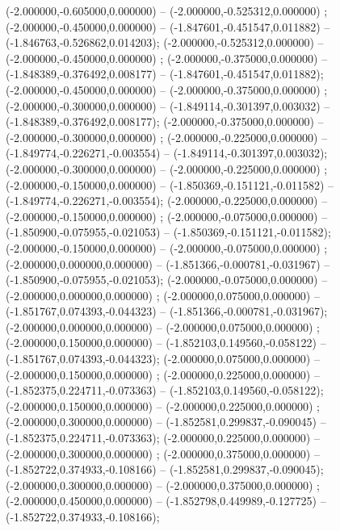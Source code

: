  (-2.000000,-0.605000,0.000000) -- (-2.000000,-0.525312,0.000000) ;
 (-2.000000,-0.450000,0.000000) -- (-1.847601,-0.451547,0.011882) -- (-1.846763,-0.526862,0.014203);
 (-2.000000,-0.525312,0.000000) -- (-2.000000,-0.450000,0.000000) ;
 (-2.000000,-0.375000,0.000000) -- (-1.848389,-0.376492,0.008177) -- (-1.847601,-0.451547,0.011882);
 (-2.000000,-0.450000,0.000000) -- (-2.000000,-0.375000,0.000000) ;
 (-2.000000,-0.300000,0.000000) -- (-1.849114,-0.301397,0.003032) -- (-1.848389,-0.376492,0.008177);
 (-2.000000,-0.375000,0.000000) -- (-2.000000,-0.300000,0.000000) ;
 (-2.000000,-0.225000,0.000000) -- (-1.849774,-0.226271,-0.003554) -- (-1.849114,-0.301397,0.003032);
 (-2.000000,-0.300000,0.000000) -- (-2.000000,-0.225000,0.000000) ;
 (-2.000000,-0.150000,0.000000) -- (-1.850369,-0.151121,-0.011582) -- (-1.849774,-0.226271,-0.003554);
 (-2.000000,-0.225000,0.000000) -- (-2.000000,-0.150000,0.000000) ;
 (-2.000000,-0.075000,0.000000) -- (-1.850900,-0.075955,-0.021053) -- (-1.850369,-0.151121,-0.011582);
 (-2.000000,-0.150000,0.000000) -- (-2.000000,-0.075000,0.000000) ;
 (-2.000000,0.000000,0.000000) -- (-1.851366,-0.000781,-0.031967) -- (-1.850900,-0.075955,-0.021053);
 (-2.000000,-0.075000,0.000000) -- (-2.000000,0.000000,0.000000) ;
 (-2.000000,0.075000,0.000000) -- (-1.851767,0.074393,-0.044323) -- (-1.851366,-0.000781,-0.031967);
 (-2.000000,0.000000,0.000000) -- (-2.000000,0.075000,0.000000) ;
 (-2.000000,0.150000,0.000000) -- (-1.852103,0.149560,-0.058122) -- (-1.851767,0.074393,-0.044323);
 (-2.000000,0.075000,0.000000) -- (-2.000000,0.150000,0.000000) ;
 (-2.000000,0.225000,0.000000) -- (-1.852375,0.224711,-0.073363) -- (-1.852103,0.149560,-0.058122);
 (-2.000000,0.150000,0.000000) -- (-2.000000,0.225000,0.000000) ;
 (-2.000000,0.300000,0.000000) -- (-1.852581,0.299837,-0.090045) -- (-1.852375,0.224711,-0.073363);
 (-2.000000,0.225000,0.000000) -- (-2.000000,0.300000,0.000000) ;
 (-2.000000,0.375000,0.000000) -- (-1.852722,0.374933,-0.108166) -- (-1.852581,0.299837,-0.090045);
 (-2.000000,0.300000,0.000000) -- (-2.000000,0.375000,0.000000) ;
 (-2.000000,0.450000,0.000000) -- (-1.852798,0.449989,-0.127725) -- (-1.852722,0.374933,-0.108166);
